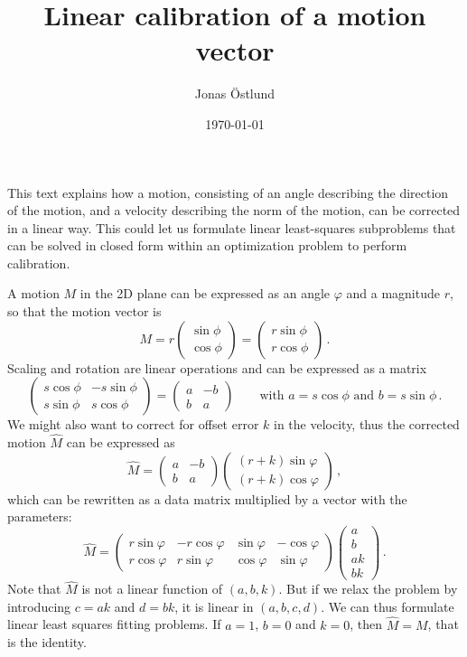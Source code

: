 \documentclass{article}
\author{Jonas Östlund}
\date{\today}
\title{Linear calibration of a motion vector}
\newcommand{\mat}[2]{\left( \begin{array}{#1} #2 \end{array} \right)}
\begin{document}
\maketitle
This text explains how a motion, consisting of an angle describing the direction of the motion, and a velocity describing the norm of the motion, can be corrected in a linear way. This could let us formulate linear least-squares subproblems that can be solved in closed form within an optimization problem to perform calibration.

A motion $M$ in the 2D plane can be expressed as an angle $\varphi$ and a magnitude $r$, so that the motion vector is
\begin{displaymath}
  M = r\mat{c}{
    \sin \phi \\
    \cos \phi
   } =
  \mat{c}{
    r \sin \phi \\
    r \cos \phi
    } \, .
\end{displaymath}
Scaling and rotation are linear operations and can be expressed as a matrix
\begin{displaymath}
\mat{cc}{
  s\cos \phi & -s \sin \phi \\
  s\sin \phi & s \cos \phi
} = \mat{cc}{a & -b \\ b & a} \qquad \text{with $a = s\cos \phi$ and $b = s\sin \phi$} \, .
\end{displaymath}
We might also want to correct for offset error $k$ in the velocity, thus the corrected motion $\hat{M}$ can be expressed as
\begin{displaymath}
\hat{M} = \mat{cc}{a & -b \\ b & a}\mat{c}{(r + k)\sin \varphi \\ (r + k)\cos \varphi} \, ,
\end{displaymath}
which can be rewritten as a data matrix multiplied by a vector with the parameters:
\begin{displaymath}
\hat{M} = \mat{cccc}{r\sin \varphi & -r \cos \varphi & 
  \sin \varphi & -\cos \varphi \\
  r\cos \varphi & r\sin \varphi & \cos \varphi & \sin \varphi}
\mat{c}{a \\ b \\ ak \\ bk} \, .
\end{displaymath}
Note that $\hat{M}$ is not a linear function of $(a, b, k)$. But if we relax the problem by introducing $c = ak$ and $d = bk$, it is linear in $(a, b, c, d)$. We can thus formulate linear least squares fitting problems. If $a = 1$, $b = 0$ and $k = 0$, then $\hat{M} = M$, that is the identity.
\end{document}
